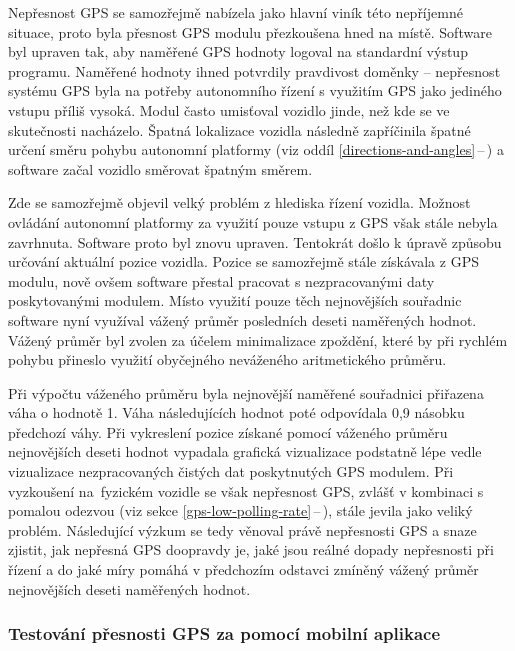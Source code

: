 \documentclass[czech, bachelor]{diploma}
\newcommand{\peteref}[1]{\ref{#1}\,--\,\nameref{#1}}
\begin{document}
Nepřesnost GPS se samozřejmě nabízela jako hlavní viník této nepříjemné situace, proto byla přesnost GPS modulu přezkoušena hned
na místě. Software byl upraven tak, aby naměřené GPS hodnoty logoval na standardní výstup programu. Naměřené hodnoty ihned
potvrdily pravdivost doměnky -- nepřesnost systému GPS byla na potřeby autonomního řízení s využitím GPS jako jediného vstupu
příliš vysoká. Modul často umisťoval vozidlo jinde, než kde se ve skutečnosti nacházelo. Špatná lokalizace vozidla následně
zapříčinila špatné určení směru pohybu autonomní platformy (viz oddíl \peteref{directions-and-angles}) a software začal vozidlo
směrovat špatným směrem.

Zde se samozřejmě objevil velký problém z hlediska řízení vozidla. Možnost ovládání autonomní platformy za využití pouze vstupu
z GPS však stále nebyla zavrhnuta. Software proto byl znovu upraven. Tentokrát došlo k úpravě způsobu určování aktuální pozice
vozidla. Pozice se samozřejmě stále získávala z GPS modulu, nově ovšem software přestal pracovat s nezpracovanými daty
poskytovanými modulem. Místo využití pouze těch nejnovějších souřadnic software nyní využíval vážený průměr posledních deseti
naměřených hodnot. Vážený průměr byl zvolen za účelem minimalizace zpoždění, které by při rychlém pohybu přineslo využití
obyčejného neváženého aritmetického průměru.

Při výpočtu váženého průměru byla nejnovější naměřené souřadnici přiřazena váha o hodnotě 1. Váha následujících hodnot poté
odpovídala 0,9 násobku předchozí váhy. Při vykreslení pozice získané pomocí váženého průměru nejnovějších deseti hodnot vypadala
grafická vizualizace podstatně lépe vedle vizualizace nezpracovaných čistých dat poskytnutých GPS modulem. Při vyzkoušení
na~fyzickém vozidle se však nepřesnost GPS, zvlášť v kombinaci s pomalou odezvou (viz sekce \peteref{gps-low-polling-rate}), stále
jevila jako veliký problém. Následující výzkum se tedy věnoval právě nepřesnosti GPS a snaze zjistit, jak nepřesná GPS doopravdy
je, jaké jsou reálné dopady nepřesnosti při řízení a do jaké míry pomáhá v předchozím odstavci zmíněný vážený průměr nejnovějších
deseti naměřených hodnot.

\subsubsection{Testování přesnosti GPS za pomocí mobilní aplikace}
\end{document}
